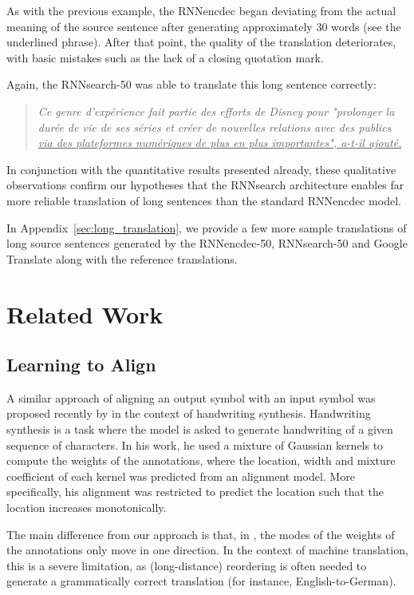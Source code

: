 \documentclass{article} %
\begin{document}
As with the previous example, the RNNencdec began deviating from the actual meaning
of the source sentence after generating approximately 30 words (see the
underlined phrase). After that point, the quality of the translation
deteriorates, with basic mistakes such as the lack of a closing quotation mark.

Again, the RNNsearch-50 was able to translate this long sentence correctly:
\begin{quote}
{    \it
Ce genre d'exp\'erience fait partie des efforts de Disney pour "prolonger la
dur\'ee de vie de ses s\'eries et cr\'eer de nouvelles relations avec des
publics \uline{via des plateformes num\'eriques de plus en plus importantes", a-t-il
ajout\'e.} }
\end{quote}

In conjunction with the quantitative results presented already, these
qualitative observations confirm our hypotheses that the RNNsearch architecture
enables far more reliable translation of long sentences than the standard RNNencdec
model. 

In Appendix~\ref{sec:long_translation}, we provide a few more sample
translations of long source sentences generated by the RNNencdec-50, RNNsearch-50
and Google Translate along with the reference translations.

\section{Related Work}

\subsection{Learning to Align}

A similar approach of aligning an output symbol with an input symbol was
proposed recently by \citet{Graves2013} in the context of handwriting synthesis.
Handwriting synthesis is a task where the model is asked to generate handwriting
of a given sequence of characters. In his work, he used a mixture of Gaussian
kernels to compute the weights of the annotations, where the location, width and
mixture coefficient of each kernel was predicted from an alignment model. More
specifically, his alignment was restricted to predict the location such that the
location increases monotonically.

The main difference from our approach is that, in \citep{Graves2013}, the modes
of the weights of the annotations only move in one direction. In the context of
machine translation, this is a severe limitation, as (long-distance) reordering
is often needed to generate a grammatically correct translation (for instance,
English-to-German).
\end{document}
